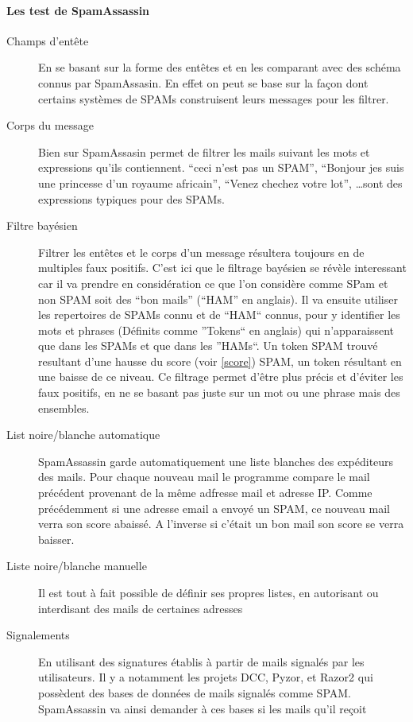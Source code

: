 \documentclass[a4paper,11pt]{article}
\begin{document}
\paragraph{Les test de SpamAssassin }
\begin{description}
 \item [Champs d'entête] En se basant sur la forme des entêtes et en les comparant avec des schéma connus par SpamAssasin. En effet 
 on peut se base sur la façon dont certains systèmes de SPAMs construisent leurs messages pour les filtrer. 
 \item [Corps du message] Bien sur SpamAssasin permet de filtrer les mails suivant les mots et expressions qu'ils contiennent. 
 ``ceci n'est pas un SPAM'', ``Bonjour jes suis une princesse d'un royaume africain'', ``Venez chechez votre lot'', \dots sont des expressions
 typiques pour des SPAMs. 
 \item [Filtre bayésien] Filtrer les entêtes et le corps d'un message résultera toujours en de multiples faux positifs. C'est ici que le filtrage 
 bayésien se révèle interessant car il va prendre en considération ce que l'on considère comme SPam et non SPAM soit des ``bon mails'' (``HAM'' en anglais).
 Il va ensuite utiliser les repertoires de SPAMs connu et de ``HAM``  connus, pour y identifier les mots et phrases (Définits comme ''Tokens`` en anglais)
 qui n'apparaissent que dans les SPAMs et que dans les ''HAMs``.
 Un token SPAM trouvé resultant d'une hausse du score (voir \ref{score}) SPAM, un token résultant en une baisse de ce niveau. Ce filtrage permet d'être plus précis et d'éviter les faux positifs, 
 en ne se basant pas juste sur un mot ou une phrase mais des ensembles. 
 \item [List noire/blanche automatique] SpamAssassin garde automatiquement une liste blanches des expéditeurs des mails.
 Pour chaque nouveau mail le programme compare le mail précédent provenant de la même adfresse mail et adresse IP.
 Comme précédemment si une adresse email a envoyé un SPAM, ce nouveau mail verra son score abaissé. A l'inverse si c'était un bon mail son score 
 se verra baisser.
 \item [Liste noire/blanche manuelle] Il est tout à fait possible de définir ses propres listes, en autorisant ou 
 interdisant des mails de certaines adresses
 \item [Signalements] En utilisant des signatures établis à partir de mails signalés par les utilisateurs. Il y a notamment les projets DCC, Pyzor, et Razor2
 qui possèdent des bases de données de mails signalés comme SPAM. SpamAssassin va ainsi demander à ces bases si les mails qu'il reçoit 

\end{description}
\end{document}
